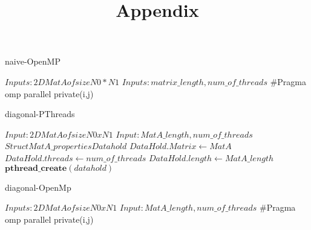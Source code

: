 \documentclass[conference]{IEEEtran}
\begin{document}
\title{Appendix} 
\maketitle

\begin{algorithm}
\caption{naive-OpenMP}
\SetAlgoLined
\DontPrintSemicolon
\state $  Inputs: 2D MatA of size   N0 * N1$\;
       $  Inputs: matrix\_length, num\_of\_threads$\;
       #Pragma omp parallel private(i,j)\;
        {
           \EndFor
           }
       \EndFor
\end{algorithm}


\begin{algorithm}
\caption{diagonal-PThreads}
\SetAlgoLined
\DontPrintSemicolon
\state $ Input: 2D MatA of size N0 x N1$\;
       $ Input: MatA\_length, num\_of\_threads $\;
       $ Struct MatA\_properties Datahold$\;
       $ DataHold.Matrix \gets MatA$\;
       $ DataHold.threads \gets num\_of\_threads$\;
       $ DataHold.length \gets MatA\_length$\;
       $ \textbf{pthread\_create}(datahold)$\;

\end{algorithm}

\begin{algorithm}
\caption{diagonal-OpenMp}
\SetAlgoLined
\DontPrintSemicolon
\state $ Inputs: 2D MatA of size N0 x N1$\;
       $ Input: MatA\_length, num\_of\_threads $\;
        #Pragma omp parallel private(i,j)\;
       \EndFor
\end{algorithm}
\end{document}
